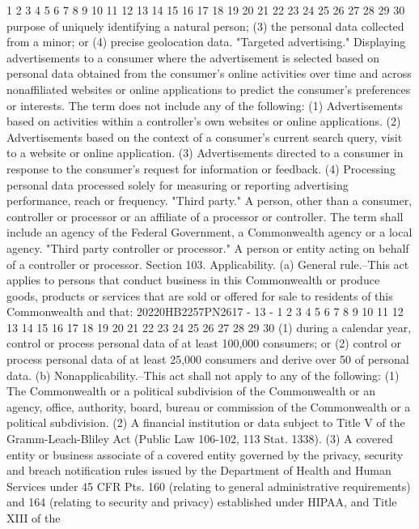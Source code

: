 1
2
3
4
5
6
7
8
9
10
11
12
13
14
15
16
17
18
19
20
21
22
23
24
25
26
27
28
29
30
purpose of uniquely identifying a natural person;
(3) the personal data collected from a minor; or
(4) precise geolocation data.
"Targeted advertising." Displaying advertisements to a
consumer where the advertisement is selected based on personal
data obtained from the consumer's online activities over time
and across nonaffiliated websites or online applications to
predict the consumer's preferences or interests. The term does
not include any of the following:
(1) Advertisements based on activities within a
controller's own websites or online applications.
(2) Advertisements based on the context of a consumer's
current search query, visit to a website or online
application.
(3) Advertisements directed to a consumer in response to
the consumer's request for information or feedback.
(4) Processing personal data processed solely for
measuring or reporting advertising performance, reach or
frequency.
"Third party." A person, other than a consumer, controller
or processor or an affiliate of a processor or controller. The
term shall include an agency of the Federal Government, a
Commonwealth agency or a local agency.
"Third party controller or processor." A person or entity
acting on behalf of a controller or processor.
Section 103. Applicability.
(a) General rule.--This act applies to persons that conduct
business in this Commonwealth or produce goods, products or
services that are sold or offered for sale to residents of this
Commonwealth and that:
20220HB2257PN2617 - 13 -
1
2
3
4
5
6
7
8
9
10
11
12
13
14
15
16
17
18
19
20
21
22
23
24
25
26
27
28
29
30
(1) during a calendar year, control or process personal
data of at least 100,000 consumers; or
(2) control or process personal data of at least 25,000
consumers and derive over 50%
of personal data.
(b) Nonapplicability.--This act shall not apply to any of
the following:
(1) The Commonwealth or a political subdivision of the
Commonwealth or an agency, office, authority, board, bureau
or commission of the Commonwealth or a political subdivision.
(2) A financial institution or data subject to Title V
of the Gramm-Leach-Bliley Act (Public Law 106-102, 113 Stat.
1338).
(3) A covered entity or business associate of a covered
entity governed by the privacy, security and breach
notification rules issued by the Department of Health and
Human Services under 45 CFR Pts. 160 (relating to general
administrative requirements) and 164 (relating to security
and privacy) established under HIPAA, and Title XIII of the
